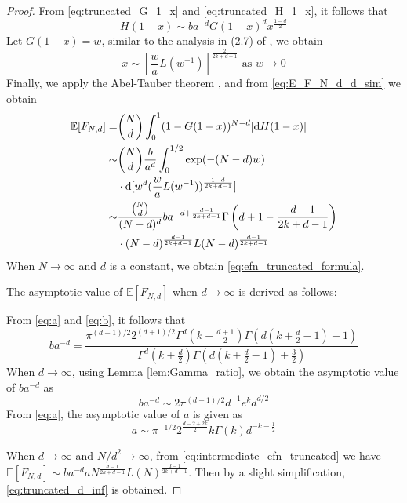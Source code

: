 \documentclass[conference,a4paper]{IEEEtran}
\def\E{\mathbb{E}}
\def\dd{\mathrm{d}}
\begin{document}
\begin{proof}
From \eqref{eq:truncated_G_1_x} and \eqref{eq:truncated_H_1_x}, it follows that
\begin{equation}
    H(1-x) \sim ba^{-d} G(1-x)^d x^{\frac{1-d}{2}}
\end{equation}
Let $G(1-x)=w$, similar to the analysis in (2.7) of
\cite{carnal1970konvexe}, we obtain
\begin{equation*}
     x \sim [\frac{w}{a} L(w^{-1})]^{\frac{2}{2k+d-1}} \textrm{ as } w \to 0
\end{equation*}
Finally, 
we apply the Abel-Tauber theorem
\cite{omey1989abelian}, and from \eqref{eq:E_F_N_d_d_sim} we obtain
\begin{align}
    \E[F_{N,d}] =& \binom{N}{d}\int_0^1 (1 - G(1-x))^{N-d} |\dd H(1-x)| 
    \notag \\
     \sim &\binom{N}{d} \frac{b}{a^d} \int_0^{1/2} \exp(-(N-d)w)\\
     & \cdot \dd [w^d (\frac{w}{a} L(w^{-1}))^{\frac{1-d}{2k+d-1}} ]
    \notag \\
    \sim &\frac{\binom{N}{d}}{(N-d)^d} ba^{-d+\frac{d-1}{2k+d-1}}
    \Gamma 
    \left(d+1-\frac{d-1}{2k+d-1}\right)\\
    &\cdot(N-d)^{\frac{d-1}{2k+d-1}}
    L(N-d)
    ^{\frac{d-1}{2k+d-1}}
    \label{eq:intermediate_efn_truncated}
\end{align}
When $N\to \infty$ and $d$ is a constant, we obtain \eqref{eq:efn_truncated_formula}.


The asymptotic value of $\E[F_{N,d}]$ when $d\to \infty$
is derived as follows:

From \eqref{eq:a} and \eqref{eq:b}, it follows that
\begin{equation}
     ba^{-d}
     = \frac{\pi^{(d-1)/2} 2^{(d+1)/2}
     \Gamma^d(k+\frac{d+1}{2})
     \Gamma(d(k+\frac{d}{2}-1)+1)}{\Gamma^d(k+\frac{d}{2})\Gamma(d(k+\frac{d}{2}-1)+ \frac{3}{2})}
 \end{equation}
 When $d\to \infty$, using Lemma \ref{lem:Gamma_ratio},
 we obtain the asymptotic value of $ba^{-d}$ as
 \begin{equation}
     ba^{-d} \sim 2\pi^{(d-1)/2}
     d^{-1}e^kd^{d/2}
 \end{equation}
 From \eqref{eq:a}, the asymptotic value of $a$ is given as
 \begin{equation}
     a \sim \pi^{-1/2} 2^{\frac{d-2+2k}{2}} k \Gamma(k) d^{-k-\frac{1}{2}}
 \end{equation}

When $d\to \infty$ and $N/d^2\to \infty$,
from \eqref{eq:intermediate_efn_truncated}
we have $\E[F_{N,d}] \sim ba^{-d} a N^{\frac{d-1}{2k+d-1}}
L(N)
^{\frac{d-1}{2k+d-1}}$.
Then by a slight simplification,
\eqref{eq:truncated_d_inf} is obtained.
\end{proof}
\end{document}
